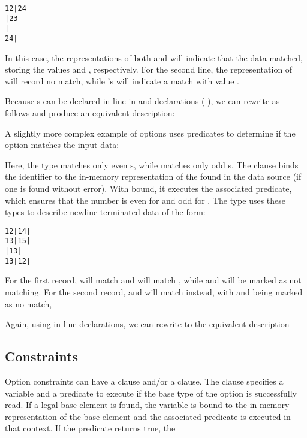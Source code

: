 \begin{verbatim}
12|24
|23
|
24|
\end{verbatim}
\noindent
In this case, the representations of both  and  will
indicate that the data matched, storing the values  and
, respectively.  For the second line, the representation of
 will record no match, while 's will indicate a match with
value . 

Because \Popt{}s can be declared in-line in \Pstruct{} and \Punion{}
declarations (\cf{}  ), we can rewrite
 as follows and produce an equivalent description:


A slightly more complex example of options uses predicates to
determine if the option matches the input data:


\noindent
Here, the type  matches only even s, while
 matches only odd s.  The \Psome{} clause binds
the identifier  to the in-memory representation of the
 found in the data source (if one is found without
error).  With  bound, it executes the associated predicate,
which ensures that the number is even for  and odd for
. 
The type  uses
these types to describe newline-terminated data of the form:
\begin{verbatim}
12|14|
13|15|
|13|
13|12|
\end{verbatim}
For the first record,  will match  and  will
match , while  and  will be marked as not
matching. For the second record,  and  will match 
instead, with  and  being marked as no match, \etc{}

Again, using in-line declarations, we can rewrite  to the
equivalent description 


\subsection{Constraints}
Option constraints can have a \Psome{} clause and/or a \Pnone{}
clause.  The \Psome{} clause specifies a variable and a predicate to
execute if the base type of the option is successfully read.  If a
legal base element is found, the variable is bound to the in-memory
representation of the base element and the associated predicate is
executed in that context.  If the predicate returns true, the

